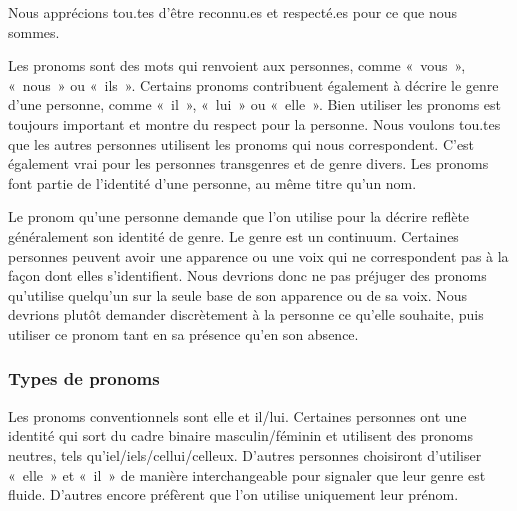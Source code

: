 \documentclass[12pt,openany]{book}
\begin{document}
\noindent Nous apprécions tou.tes d’être reconnu.es et respecté.es pour ce que nous sommes.

Les pronoms sont des mots qui renvoient aux personnes, comme \mbox{« vous »}, \mbox{« nous »} ou \mbox{« ils »}. Certains pronoms contribuent également à décrire le genre d’une personne, comme \mbox{« il »}, \mbox{« lui »} ou \mbox{« elle »}. Bien utiliser les pronoms est toujours important et montre du respect pour la personne. Nous voulons tou.tes que les autres personnes utilisent les pronoms qui nous correspondent. C’est également vrai pour les personnes transgenres et de genre divers. Les pronoms font partie de l’identité d’une personne, au même titre qu’un nom.

Le pronom qu’une personne demande que l’on utilise pour la décrire reflète généralement son identité de genre. Le genre est un continuum. Certaines personnes peuvent avoir une apparence ou une voix qui ne correspondent pas à la façon dont elles s’identifient. Nous devrions donc ne pas préjuger des pronoms qu’utilise quelqu’un sur la seule base de son apparence ou de sa voix. Nous devrions plutôt demander discrètement à la personne ce qu’elle souhaite, puis utiliser ce pronom tant en sa présence qu’en son absence.

\subsubsection*{Types de pronoms}

\noindent Les pronoms conventionnels sont elle et il/lui. Certaines personnes ont une identité qui sort du cadre binaire masculin/féminin et utilisent des pronoms neutres, tels qu’iel/iels/cellui/celleux. D’autres personnes choisiront d’utiliser \mbox{« elle »} et \mbox{« il »} de manière interchangeable pour signaler que leur genre est fluide. D’autres encore préfèrent que l’on utilise uniquement leur prénom.

\begin{figure}[h]
    \centering
\end{figure}
\end{document}
